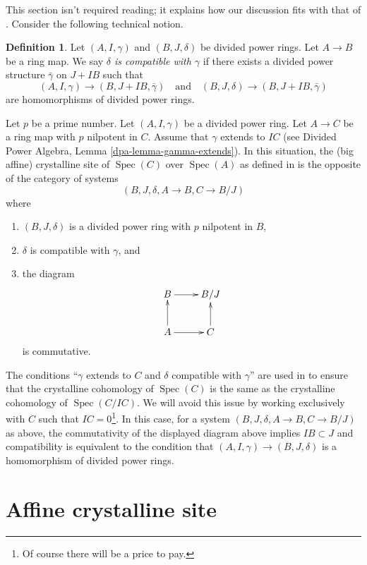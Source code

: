 \documentclass{stacks-project}
\theoremstyle{plain}
\theoremstyle{definition}
\newtheorem{definition}[subsection]{Definition}
\theoremstyle{remark}
\numberwithin{equation}{subsection}
\def\Spec{\mathop{\mathrm{Spec}}}
\begin{document}
\noindent
This section isn't required reading; it explains how our discussion
fits with that of \cite{Berthelot}.
Consider the following technical notion.

\begin{definition}
\label{definition-compatible}
Let $(A, I, \gamma)$ and $(B, J, \delta)$ be divided power rings.
Let $A \to B$ be a ring map. We say
{\it $\delta$ is compatible with $\gamma$}
if there exists a divided power structure $\bar\gamma$ on
$J + IB$ such that
$$
(A, I, \gamma) \to (B, J + IB, \bar \gamma)\quad\text{and}\quad
(B, J, \delta) \to (B, J + IB, \bar \gamma)
$$
are homomorphisms of divided power rings.
\end{definition}

\noindent
Let $p$ be a prime number. Let $(A, I, \gamma)$ be a divided power ring.
Let $A \to C$ be a ring map with $p$ nilpotent in $C$.
Assume that $\gamma$ extends to $IC$ (see
Divided Power Algebra, Lemma \ref{dpa-lemma-gamma-extends}).
In this situation, the (big affine) crystalline site of
$\Spec(C)$ over $\Spec(A)$
as defined in \cite{Berthelot} 
is the opposite of the category of systems
$$
(B, J, \delta, A \to B, C \to B/J)
$$
where
\begin{enumerate}
\item $(B, J, \delta)$ is a divided power ring with $p$ nilpotent in $B$,
\item $\delta$ is compatible with $\gamma$, and
\item the diagram
$$
\xymatrix{
B \ar[r] & B/J \\
A \ar[u] \ar[r] & C \ar[u]
}
$$
is commutative.
\end{enumerate}
The conditions
``$\gamma$ extends to $C$ and $\delta$ compatible with $\gamma$''
are used in \cite{Berthelot} to ensure that
the crystalline cohomology of $\Spec(C)$ is the same as the crystalline
cohomology of $\Spec(C/IC)$. We will avoid this issue
by working exclusively with $C$ such that $IC = 0$\footnote{Of course there
will be a price to pay.}. In this case,
for a system $(B, J, \delta, A \to B, C \to B/J)$ as above,
the commutativity of the displayed diagram above implies $IB \subset J$ and
compatibility is equivalent to the condition that
$(A, I, \gamma) \to (B, J, \delta)$ is a homomorphism of divided
power rings.




\section{Affine crystalline site}
\label{section-affine-site}
\end{document}
